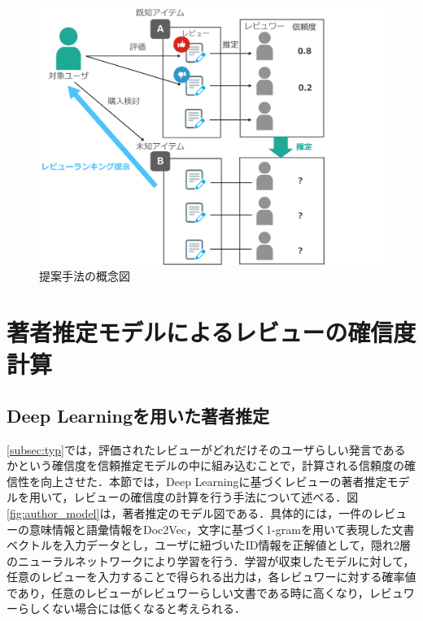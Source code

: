 \documentclass[a4paper,11pt,oneside,openany]{jsbook}
\begin{document}
\begin{figure}[htb]
	\begin{center} %
		\includegraphics [width = 120mm] {figures/rev_method_image.pdf} %
	\end{center}
	\caption{提案手法の概念図} %
	\label{fig:rev_method} %
\end{figure}

	\section{著者推定モデルによるレビューの確信度計算}
	\subsection{Deep Learningを用いた著者推定}
\label{subsec:author_model}
\ref{subsec:typ}では，評価されたレビューがどれだけそのユーザらしい発言であるかという確信度を信頼推定モデルの中に組み込むことで，計算される信頼度の確信性を向上させた．本節では，Deep Learningに基づくレビューの著者推定モデルを用いて，レビューの確信度の計算を行う手法について述べる．図\ref{fig:author_model}は，著者推定のモデル図である．具体的には，一件のレビューの意味情報と語彙情報をDoc2Vec，文字に基づく1-gramを用いて表現した文書ベクトルを入力データとし，ユーザに紐づいたID情報を正解値として，隠れ2層のニューラルネットワークにより学習を行う．学習が収束したモデルに対して，任意のレビューを入力することで得られる出力は，各レビュワーに対する確率値であり，任意のレビューがレビュワーらしい文書である時に高くなり，レビュワーらしくない場合には低くなると考えられる．
\end{document}
